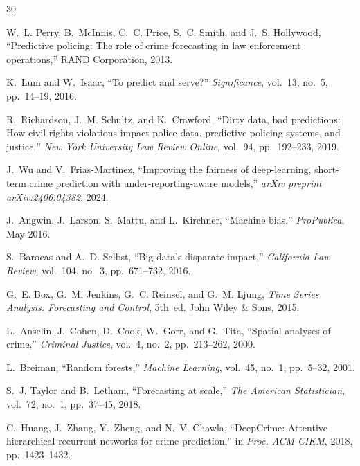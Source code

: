 \documentclass[conference]{IEEEtran}
\begin{document}

\begin{thebibliography}{30}

W.~L. Perry, B.~McInnis, C.~C. Price, S.~C. Smith, and J.~S. Hollywood, ``Predictive policing: The role of crime forecasting in law enforcement operations,'' RAND Corporation, 2013.

K.~Lum and W.~Isaac, ``To predict and serve?'' \textit{Significance}, vol.~13, no.~5, pp.~14--19, 2016.

R.~Richardson, J.~M. Schultz, and K.~Crawford, ``Dirty data, bad predictions: How civil rights violations impact police data, predictive policing systems, and justice,'' \textit{New York University Law Review Online}, vol.~94, pp.~192--233, 2019.

J.~Wu and V.~Frias-Martinez, ``Improving the fairness of deep-learning, short-term crime prediction with under-reporting-aware models,'' \textit{arXiv preprint arXiv:2406.04382}, 2024.

J.~Angwin, J.~Larson, S.~Mattu, and L.~Kirchner, ``Machine bias,'' \textit{ProPublica}, May 2016.

S.~Barocas and A.~D. Selbst, ``Big data's disparate impact,'' \textit{California Law Review}, vol.~104, no.~3, pp.~671--732, 2016.

G.~E. Box, G.~M. Jenkins, G.~C. Reinsel, and G.~M. Ljung, \textit{Time Series Analysis: Forecasting and Control}, 5th~ed. John Wiley \& Sons, 2015.

L.~Anselin, J.~Cohen, D.~Cook, W.~Gorr, and G.~Tita, ``Spatial analyses of crime,'' \textit{Criminal Justice}, vol.~4, no.~2, pp.~213--262, 2000.

L.~Breiman, ``Random forests,'' \textit{Machine Learning}, vol.~45, no.~1, pp.~5--32, 2001.

S.~J. Taylor and B.~Letham, ``Forecasting at scale,'' \textit{The American Statistician}, vol.~72, no.~1, pp.~37--45, 2018.

C.~Huang, J.~Zhang, Y.~Zheng, and N.~V. Chawla, ``DeepCrime: Attentive hierarchical recurrent networks for crime prediction,'' in \textit{Proc. ACM CIKM}, 2018, pp.~1423--1432.


\end{thebibliography}
\end{document}
